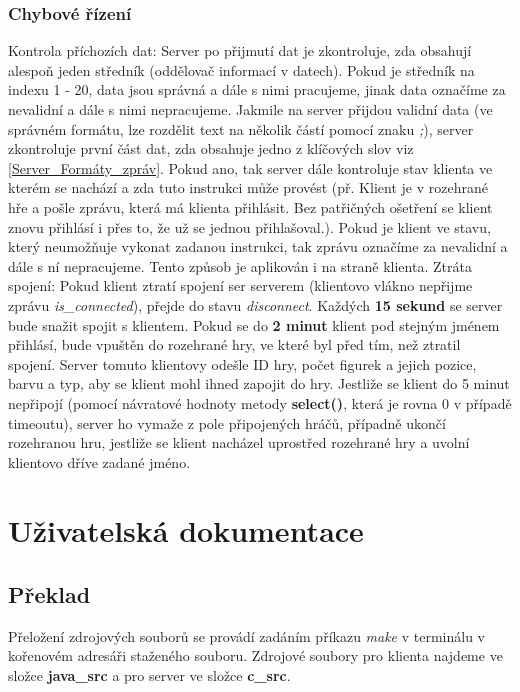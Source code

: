 \documentclass[12pt, a4paper]{article}
\begin{document}
\subsubsection{Chybové řízení}
\label{Chybove_rizeni}
Kontrola příchozích dat: Server po přijmutí dat je zkontroluje, zda obsahují alespoň jeden středník (oddělovač informací v datech). Pokud je středník na indexu 1 - 20, data jsou správná a dále s nimi pracujeme, jinak data označíme za nevalidní a dále s nimi nepracujeme.
\newline
Jakmile na server přijdou validní data (ve správném formátu, lze rozdělit text na několik částí pomocí znaku \textit{;}), server zkontroluje první část dat, zda obsahuje jedno z klíčových slov viz \ref{Server_Formáty_zpráv}. Pokud ano, tak server dále kontroluje stav klienta ve kterém se nachází a zda tuto instrukci může provést (př. Klient je v rozehrané hře a pošle zprávu, která má klienta přihlásit. Bez patřičných ošetření se klient znovu přihlásí i přes to, že už se jednou přihlašoval.). Pokud je klient ve stavu, který neumožňuje vykonat zadanou instrukci, tak zprávu označíme za nevalidní a dále s ní nepracujeme. Tento způsob je aplikován i na straně klienta.
\newline
Ztráta spojení: Pokud klient ztratí spojení ser serverem (klientovo vlákno nepřijme zprávu \textit{is\_connected}), přejde do stavu \textit{disconnect}. Každých \textbf{15 sekund} se server bude snažit spojit s klientem. Pokud se do \textbf{2 minut} klient pod stejným jménem přihlásí, bude vpuštěn do rozehrané hry, ve které byl před tím, než ztratil spojení. Server tomuto klientovy odešle ID hry, počet figurek a jejich pozice, barvu a typ, aby se klient mohl ihned zapojit do hry.
\newline
Jestliže se klient do 5 minut nepřipojí (pomocí návratové hodnoty metody \textbf{select()}, která je rovna 0 v případě timeoutu), server ho vymaže z pole připojených hráčů, případně ukončí rozehranou hru, jestliže se klient nacházel uprostřed rozehrané hry a uvolní klientovo dříve zadané jméno. 
\section{Uživatelská dokumentace}
\label{Uživatelská_dokumentace}
\subsection{Překlad}
\label{Překlad}
Přeložení zdrojových souborů se provádí zadáním příkazu \textit{make} v terminálu v kořenovém adresáři staženého souboru. Zdrojové soubory pro klienta najdeme ve složce \textbf{\/java\_src\/} a pro server ve složce \textbf{\/c\_src\/}.
\end{document}
